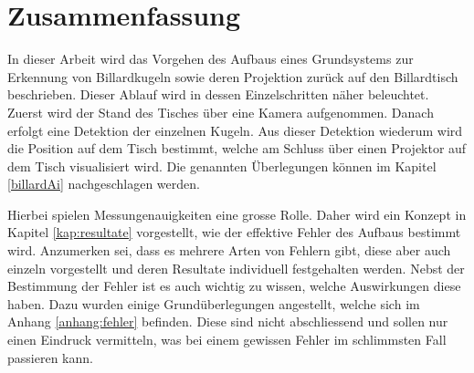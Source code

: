 \chapter{Zusammenfassung}
In dieser Arbeit wird das Vorgehen des Aufbaus eines Grundsystems zur Erkennung von Billardkugeln sowie deren
Projektion zurück auf den Billardtisch beschrieben. Dieser Ablauf wird in dessen Einzelschritten näher beleuchtet.
Zuerst wird der Stand des Tisches über eine Kamera aufgenommen. Danach erfolgt eine Detektion der einzelnen Kugeln.
Aus dieser Detektion wiederum wird die Position auf dem Tisch bestimmt, welche am Schluss über einen Projektor
auf dem Tisch visualisiert wird. Die genannten Überlegungen können im Kapitel \ref{billardAi} nachgeschlagen werden.

Hierbei spielen Messungenauigkeiten eine grosse Rolle. Daher wird ein Konzept in Kapitel \ref{kap:resultate} vorgestellt, wie der
effektive Fehler des Aufbaus bestimmt wird. Anzumerken sei, dass es mehrere Arten von Fehlern gibt, diese aber auch einzeln
vorgestellt und deren Resultate individuell festgehalten werden. Nebst der Bestimmung der Fehler ist es auch wichtig zu wissen,
welche Auswirkungen diese haben. Dazu wurden einige Grundüberlegungen angestellt, welche sich im Anhang \ref{anhang:fehler}
befinden. Diese sind nicht abschliessend und sollen nur einen Eindruck vermitteln, was bei einem gewissen Fehler im schlimmsten
Fall passieren kann.